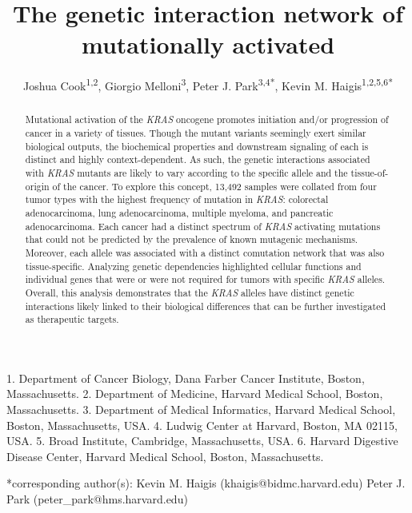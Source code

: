 \documentclass[english, 10pt, letterpaper]{article}
\title{The genetic interaction network of mutationally activated \KRAS{}}
\author{
    Joshua Cook\textsuperscript{1,2},
    Giorgio Melloni\textsuperscript{3}, 
    Peter J. Park\textsuperscript{3,4{*}}, 
    Kevin M. Haigis\textsuperscript{1,2,5,6{*}}
}
\newcommand{\KRAS}{\emph{KRAS}}
\begin{document}

\maketitle

\thispagestyle{fancy}

1. Department of Cancer Biology, Dana Farber Cancer Institute, Boston, Massachusetts.
2. Department of Medicine, Harvard Medical School, Boston, Massachusetts.
3. Department of Medical Informatics, Harvard Medical School, Boston, Massachusetts, USA.
4. Ludwig Center at Harvard, Boston, MA 02115, USA.
5. Broad Institute, Cambridge, Massachusetts, USA.
6. Harvard Digestive Disease Center, Harvard Medical School, Boston, Massachusetts.

{*}corresponding author(s):
\newline{} \hspace*{1cm} Kevin M. Haigis (khaigis@bidmc.harvard.edu)
\newline{} \hspace*{1cm} Peter J. Park (peter\_park@hms.harvard.edu)

\begin{abstract}
Mutational activation of the \KRAS{} oncogene promotes initiation and/or progression of cancer in a variety of tissues.
Though the mutant variants seemingly exert similar biological outputs, the biochemical properties and downstream signaling  of each is distinct and highly context-dependent.
As such, the genetic interactions associated with \KRAS{} mutants are likely to vary according to the specific allele and the tissue-of-origin of the cancer.
To explore this concept, 13,492 samples were collated from four tumor types with the highest frequency of mutation in \KRAS{}: colorectal adenocarcinoma, lung adenocarcinoma, multiple myeloma, and pancreatic adenocarcinoma.
Each cancer had a distinct spectrum of \KRAS{} activating mutations that could not be predicted by the prevalence of known mutagenic mechanisms.
Moreover, each allele was associated with a distinct comutation network that was also tissue-specific.
Analyzing genetic dependencies highlighted cellular functions and individual genes that were or were not required for tumors with specific \KRAS{} alleles.
Overall, this analysis demonstrates that the \KRAS{} alleles have distinct genetic interactions likely linked to their biological differences that can be further investigated as therapeutic targets.
\end{abstract}
\end{document}
